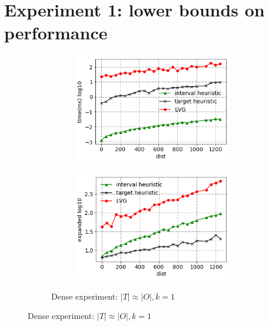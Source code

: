 \section{Experiment 1: lower bounds on performance}
\begin{figure}[!htb]
  \begin{subfigure}{\linewidth}
    \begin{subfigure}{0.5\textwidth}
        \centering
        \includegraphics[width=.9\textwidth]{pic/e1_dense_time.png}
        \caption{}
        \label{e1_dense_time}
    \end{subfigure}%
    \hfill
    \begin{subfigure}{0.5\textwidth}
        \centering
        \includegraphics[width=.9\textwidth]{pic/e1_dense_gen.png}
        \caption{}
        \label{e1_dense_gen}
    \end{subfigure}
    \caption*{\small Dense experiment: $|T| \approx |O|,k=1$}
  \end{subfigure}\par\medskip

\end{figure}
